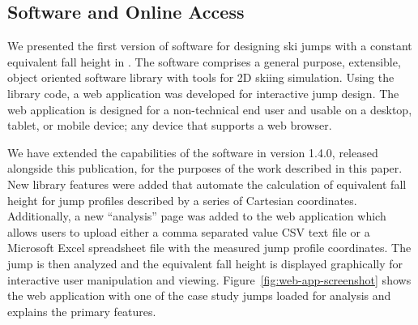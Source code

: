 \documentclass[smallextended]{svjour3}       %
\begin{document}

\subsection{Software and Online Access}
\label{sec:software}
%
We presented the first version of software for designing ski jumps with a
constant equivalent fall height in \cite{Moore2018}. The software comprises
a general purpose, extensible, object oriented software library with tools for
2D skiing simulation. Using the library code, a web application was developed
for interactive jump design. The web application is designed for a
non-technical end user and usable on a desktop, tablet, or mobile device; any
device that supports a web browser.

We have extended the capabilities of the software in version 1.4.0, released
alongside this publication, for the purposes of the work described in this
paper. New library features were added that automate the calculation of
equivalent fall height for jump profiles described by a series of Cartesian
coordinates. Additionally, a new ``analysis'' page was added to the web
application which allows users to upload either a comma separated value CSV
text file or a Microsoft Excel spreadsheet file with the measured jump profile
coordinates. The jump is then analyzed and the equivalent fall height is
displayed graphically for interactive user manipulation and viewing.
Figure~\ref{fig:web-app-screenshot} shows the web application with one of the
case study jumps loaded for analysis and explains the primary features.
%
\end{document}
